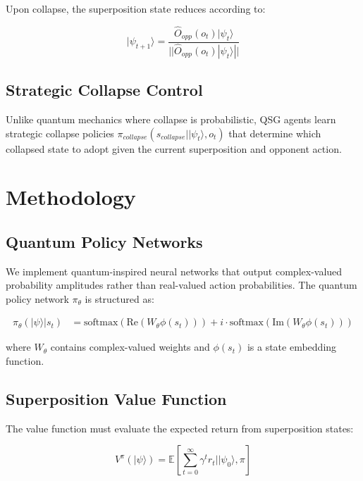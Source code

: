 \documentclass[11pt,a4paper]{article}
\begin{document}
Upon collapse, the superposition state reduces according to:

\begin{equation}
|\psi_{t+1}\rangle = \frac{\hat{O}_{opp}(o_t)|\psi_t\rangle}{||\hat{O}_{opp}(o_t)|\psi_t\rangle||}
\end{equation}

\subsection{Strategic Collapse Control}

Unlike quantum mechanics where collapse is probabilistic, QSG agents learn strategic collapse policies $\pi_{collapse}(s_{collapse}||\psi_t\rangle, o_t)$ that determine which collapsed state to adopt given the current superposition and opponent action.

\section{Methodology}

\subsection{Quantum Policy Networks}

We implement quantum-inspired neural networks that output complex-valued probability amplitudes rather than real-valued action probabilities. The quantum policy network $\pi_\theta$ is structured as:

\begin{align}
\pi_\theta(|\psi\rangle|s_t) &= \text{softmax}(\text{Re}(W_\theta \phi(s_t))) + i \cdot \text{softmax}(\text{Im}(W_\theta \phi(s_t)))
\end{align}

where $W_\theta$ contains complex-valued weights and $\phi(s_t)$ is a state embedding function.

\subsection{Superposition Value Function}

The value function must evaluate the expected return from superposition states:

\begin{equation}
V^{\pi}(|\psi\rangle) = \mathbb{E}\left[\sum_{t=0}^{\infty} \gamma^t r_t \Big| |\psi_0\rangle, \pi\right]
\end{equation}
\end{document}
